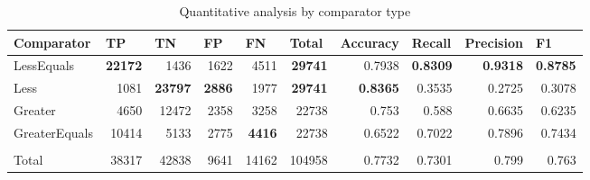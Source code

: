 \begin{appendices}
\begin{table*}[htbp]
\begin{tabular}{|l|r|r|r|r|r|r|r|r|r|}
\hline
\textbf{Comparator} & \multicolumn{1}{l|}{\textbf{TP}} & \multicolumn{1}{l|}{\textbf{TN}} & \multicolumn{1}{l|}{\textbf{FP}} & \multicolumn{1}{l|}{\textbf{FN}} & \multicolumn{1}{l|}{\textbf{Total}} & \multicolumn{1}{l|}{\textbf{Accuracy}} & \multicolumn{1}{l|}{\textbf{Recall}} & \multicolumn{1}{l|}{\textbf{Precision}} & \multicolumn{1}{l|}{\textbf{F1}} \\ \hline
LessEquals & \textbf{22172} & 1436 & 1622 & 4511 & \textbf{29741} & 0.7938 & \textbf{0.8309} & \textbf{0.9318} & \textbf{0.8785} \\ \hline
Less & 1081 & \textbf{23797} & \textbf{2886} & 1977 & \textbf{29741} & \textbf{0.8365} & 0.3535 & 0.2725 & 0.3078 \\ \hline
Greater & 4650 & 12472 & 2358 & 3258 & 22738 & 0.753 & 0.588 & 0.6635 & 0.6235 \\ \hline
GreaterEquals & 10414 & 5133 & 2775 & \textbf{4416} & 22738 & 0.6522 & 0.7022 & 0.7896 & 0.7434 \\ \hline
 & \multicolumn{1}{l|}{} & \multicolumn{1}{l|}{} & \multicolumn{1}{l|}{} & \multicolumn{1}{l|}{} & \multicolumn{1}{l|}{} & \multicolumn{1}{l|}{} & \multicolumn{1}{l|}{} & \multicolumn{1}{l|}{} & \multicolumn{1}{l|}{} \\ \hline
Total & 38317 & 42838 & 9641 & 14162 & 104958 & 0.7732 & 0.7301 & 0.799 & 0.763 \\ \hline
\end{tabular}
\caption{Quantitative analysis by comparator type}
\label{tab:operator_statistics}
\end{table*}




\end{appendices}
